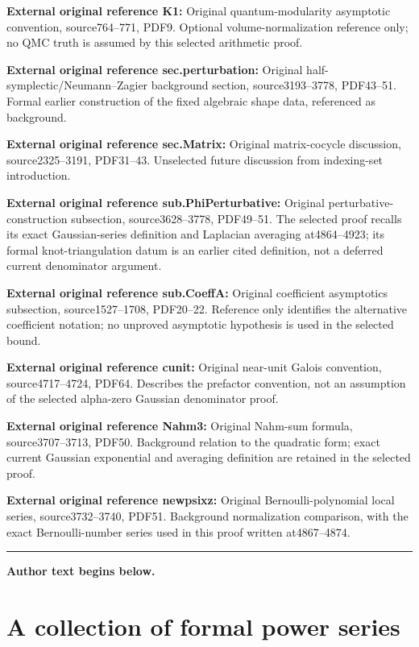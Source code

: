 \documentclass[11pt]{article}
\numberwithin{equation}{section}
\numberwithin{equation}{section}
\begin{document}
\noindent\textbf{External original reference K1:} Original quantum-modularity asymptotic convention, source764–771, PDF9. Optional volume-normalization reference only; no QMC truth is assumed by this selected arithmetic proof.\par
\noindent\textbf{External original reference sec.perturbation:} Original half-symplectic/Neumann–Zagier background section, source3193–3778, PDF43–51. Formal earlier construction of the fixed algebraic shape data, referenced as background.\par
\noindent\textbf{External original reference sec.Matrix:} Original matrix-cocycle discussion, source2325–3191, PDF31–43. Unselected future discussion from indexing-set introduction.\par
\noindent\textbf{External original reference sub.PhiPerturbative:} Original perturbative-construction subsection, source3628–3778, PDF49–51. The selected proof recalls its exact Gaussian-series definition and Laplacian averaging at4864–4923; its formal knot-triangulation datum is an earlier cited definition, not a deferred current denominator argument.\par
\noindent\textbf{External original reference sub.CoeffA:} Original coefficient asymptotics subsection, source1527–1708, PDF20–22. Reference only identifies the alternative coefficient notation; no unproved asymptotic hypothesis is used in the selected bound.\par
\noindent\textbf{External original reference cunit:} Original near-unit Galois convention, source4717–4724, PDF64. Describes the prefactor convention, not an assumption of the selected alpha-zero Gaussian denominator proof.\par
\noindent\textbf{External original reference Nahm3:} Original Nahm-sum formula, source3707–3713, PDF50. Background relation to the quadratic form; exact current Gaussian exponential and averaging definition are retained in the selected proof.\par
\noindent\textbf{External original reference newpsixz:} Original Bernoulli-polynomial local series, source3732–3740, PDF51. Background normalization comparison, with the exact Bernoulli-number series used in this proof written at4867–4874.\par
\medskip\hrule\medskip\noindent\textbf{Author text begins below.}\par
\setcounter{section}{1}
\section{A collection of formal power series}
\label{sec.Phi}
\end{document}
